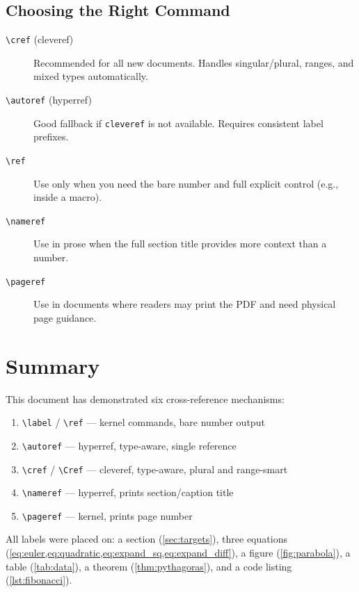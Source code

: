 \documentclass[12pt,a4paper]{article}
\begin{document}
\subsection{Choosing the Right Command}

\begin{description}
    \item[\texttt{\textbackslash cref} (cleveref)] Recommended for all new
        documents. Handles singular/plural, ranges, and mixed types
        automatically.
    \item[\texttt{\textbackslash autoref} (hyperref)] Good fallback if
        \texttt{cleveref} is not available.  Requires consistent label
        prefixes.
    \item[\texttt{\textbackslash ref}] Use only when you need the bare number
        and full explicit control (e.g., inside a macro).
    \item[\texttt{\textbackslash nameref}] Use in prose when the full section
        title provides more context than a number.
    \item[\texttt{\textbackslash pageref}] Use in documents where readers
        may print the PDF and need physical page guidance.
\end{description}


\section*{Summary}

This document has demonstrated six cross-reference mechanisms:

\begin{enumerate}
    \item \verb|\label| / \verb|\ref| — kernel commands, bare number output
    \item \verb|\autoref| — hyperref, type-aware, single reference
    \item \verb|\cref| / \verb|\Cref| — cleveref, type-aware, plural and range-smart
    \item \verb|\nameref| — hyperref, prints section/caption title
    \item \verb|\pageref| — kernel, prints page number
\end{enumerate}

All labels were placed on: a section (\cref{sec:targets}), three equations
(\cref{eq:euler,eq:quadratic,eq:expand_sq,eq:expand_diff}), a figure
(\cref{fig:parabola}), a table (\cref{tab:data}), a theorem
(\cref{thm:pythagoras}), and a code listing (\cref{lst:fibonacci}).
\end{document}
